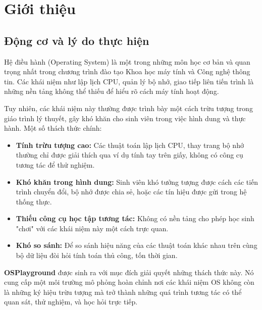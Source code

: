 
\chapter{Giới thiệu}
\label{ch:introduction}

\section{Động cơ và lý do thực hiện}

Hệ điều hành (Operating System) là một trong những môn học cơ bản và quan trọng nhất 
trong chương trình đào tạo Khoa học máy tính và Công nghệ thông tin. Các khái niệm như 
lập lịch CPU, quản lý bộ nhớ, giao tiếp liên tiến trình là những nền tảng không thể thiếu 
để hiểu rõ cách máy tính hoạt động.

Tuy nhiên, các khái niệm này thường được trình bày một cách trừu tượng trong giáo trình lý thuyết, 
gây khó khăn cho sinh viên trong việc hình dung và thực hành. Một số thách thức chính:

\begin{itemize}[leftmargin=1.5cm]
  \item \textbf{Tính trừu tượng cao:} Các thuật toán lập lịch CPU, thay trang bộ nhớ 
  thường chỉ được giải thích qua ví dụ tính tay trên giấy, không có công cụ tương tác để thử nghiệm.
  
  \item \textbf{Khó khăn trong hình dung:} Sinh viên khó tưởng tượng được cách các tiến trình 
  chuyển đổi, bộ nhớ được chia sẻ, hoặc các tín hiệu được gửi trong hệ thống thực.
  
  \item \textbf{Thiếu công cụ học tập tương tác:} Không có nền tảng cho phép học sinh 
  "chơi" với các khái niệm này một cách trực quan.
  
  \item \textbf{Khó so sánh:} Để so sánh hiệu năng của các thuật toán khác nhau 
  trên cùng bộ dữ liệu đòi hỏi tính toán thủ công, tốn thời gian.
\end{itemize}

\textbf{OSPlayground} được sinh ra với mục đích giải quyết những thách thức này. 
Nó cung cấp một môi trường mô phỏng hoàn chỉnh nơi các khái niệm OS không còn là những 
ký hiệu trừu tượng mà trở thành những quá trình tương tác có thể quan sát, 
thử nghiệm, và học hỏi trực tiếp.

